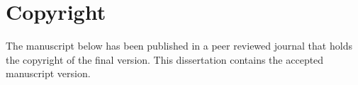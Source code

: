 \singlespacing
\chapter*{Copyright}
The manuscript below has been published in a peer reviewed journal that holds the copyright of the final version. This dissertation contains the accepted manuscript version.

\vspace{3mm}
% 

\lipsum[1]
\doublespacing